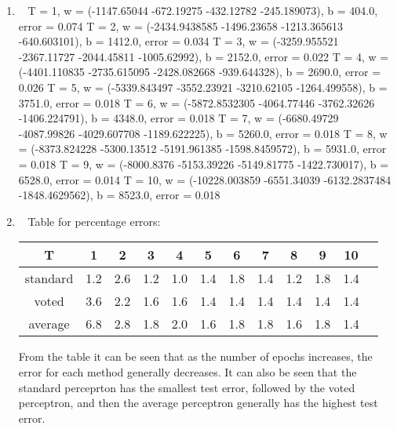 \documentclass[12pt, fullpage,letterpaper]{article}
\begin{document}
\begin{enumerate}
\begin{enumerate}
	\item~
	\newline T = 1, w = (-1147.65044   -672.19275   -432.12782   -245.189073), b = 404.0, error = 0.074
	\newline T = 2, w = (-2434.9438585 -1496.23658   -1213.365613   -640.603101), b = 1412.0, error = 0.034
	\newline T = 3, w = (-3259.955521 -2367.11727  -2044.45811  -1005.62992), b = 2152.0, error = 0.022
	\newline T = 4, w = (-4401.110835 -2735.615095 -2428.082668  -939.644328), b = 2690.0, error = 0.026
	\newline T = 5, w = (-5339.843497 -3552.23921  -3210.62105  -1264.499558), b = 3751.0, error = 0.018
	\newline T = 6, w = (-5872.8532305 -4064.77446   -3762.32626   -1406.224791), b = 4348.0, error = 0.018
	\newline T = 7, w = (-6680.49729  -4087.99826  -4029.607708 -1189.622225), b = 5260.0, error = 0.018
	\newline T = 8, w = (-8373.824228  -5300.13512   -5191.961385  -1598.8459572), b = 5931.0, error = 0.018
	\newline T = 9, w = (-8000.8376   -5153.39226  -5149.81775  -1422.730017), b = 6528.0, error = 0.014
	\newline T = 10, w = (-10228.003859   -6551.34039    -6132.2837484  -1848.4629562), b = 8523.0, error = 0.018

 
	\item~
	\newline Table for percentage errors:

	\begin{table}[h]
	\centering
	\begin{tabular}{ccccccccccc|c}
		T & 1 & 2 & 3 & 4 & 5 & 6 & 7 & 8 & 9 & 10\\ 
		\hline\hline
		standard & 1.2 & 2.6 & 1.2 & 1.0 & 1.4 & 1.8 & 1.4 & 1.2 & 1.8 & 1.4 \\ \hline
		voted & 3.6 & 2.2 & 1.6 & 1.6 & 1.4 & 1.4 & 1.4 & 1.4 & 1.4 & 1.4 \\ \hline
		average & 6.8 & 2.8 & 1.8 & 2.0 & 1.6 & 1.8 & 1.8 & 1.6 & 1.8 & 1.4 \\ \hline
	\end{tabular}
\end{table}

 From the table it can be seen that as the number of epochs increases, the error for each method generally decreases. It can also be seen that the standard perceprton has the smallest test error, followed by the voted perceptron, and then the average perceptron generally has the highest test error. 

\end{enumerate}


\end{enumerate}
\end{document}
